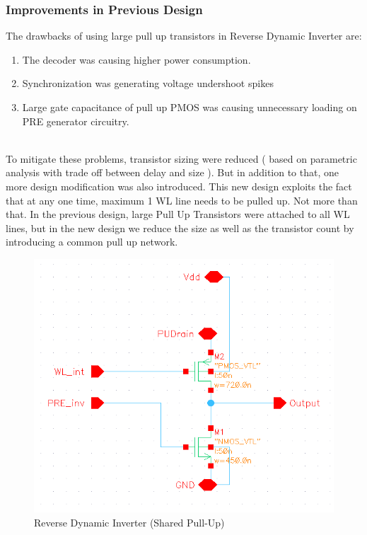 \documentclass[10pt,letterpaper,onecolumn]{article}
\begin{document}
\subsubsection{Improvements in Previous Design}

The drawbacks of using large pull up transistors in Reverse Dynamic Inverter are: 

\begin{enumerate}
  \item The decoder was causing higher power consumption.
  \item Synchronization was generating voltage undershoot spikes
  \item Large gate capacitance of pull up PMOS was causing unnecessary loading on PRE generator circuitry.
\end{enumerate} \\
To mitigate these problems, transistor sizing were reduced ( based on parametric analysis with trade off between delay and size ). But in addition to that, one more design modification was also introduced. This new design exploits the fact that at any one time, maximum 1 WL line needs to be pulled up. Not more than that. In the previous design, large Pull Up Transistors were attached to all WL lines, but in the new design we reduce the size as well as the transistor count by introducing a common pull up network. \\

\begin{figure}[h!]
\centering
\includegraphics[scale=0.6]{RevDynamicNew.png}
\caption{Reverse Dynamic Inverter (Shared Pull-Up) }
\label{fig:RevDynamicNew}
\end{figure}
\end{document}
